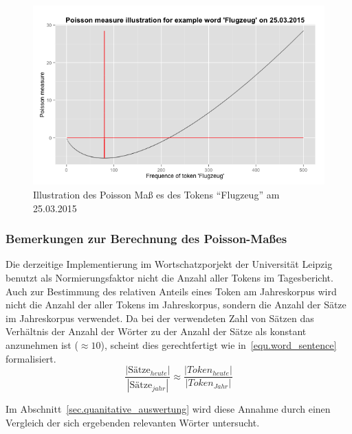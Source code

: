 \begin{figure}[h!]
    \centering
    \includegraphics[width=1\textwidth]{pictures/poissonMeasureFlugzeug.png}
    \caption{Illustration des Poisson Maß es des Tokens \enquote{Flugzeug} am 25.03.2015}\label{pic.poisson_mass}
\end{figure}


\subsubsection{Bemerkungen zur Berechnung des Poisson-Maßes}
Die derzeitige Implementierung im Wortschatzporjekt der Universität Leipzig benutzt als Normierungsfaktor nicht die Anzahl aller Tokens im Tagesbericht. Auch zur Bestimmung des relativen Anteils eines Token am Jahreskorpus wird nicht die Anzahl der aller Tokens im Jahreskorpus, sondern die Anzahl der Sätze im Jahreskorpus verwendet. Da bei der verwendeten Zahl von Sätzen das Verhältnis der Anzahl der Wörter zu der Anzahl der Sätze als konstant anzunehmen ist ($\approx 10$), scheint dies gerechtfertigt wie in~\ref{equ.word_sentence} formalisiert. 
\begin{equation}\label{equ.word_sentence}
\frac{|\text{Sätze}_{heute}|}{|\text{Sätze}_{jahr}|} \approx \frac{|Token_{heute}|}{|Token_{Jahr}|}
\end{equation}

Im Abschnitt~\ref{sec.quanitative_auswertung} wird diese Annahme durch einen Vergleich der sich ergebenden relevanten Wörter untersucht.

